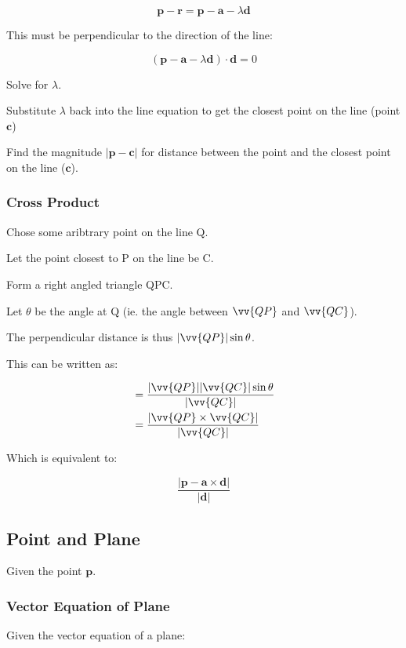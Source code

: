 \documentclass[a4paper,11pt]{article}
\newcommand{\bb}{\boldsymbol}
\begin{document}
$$
\bb{p} - \bb{r} = \bb{p} - \bb{a} - \lambda \bb{d}
$$

This must be perpendicular to the direction of the line:

$$
(\bb{p} - \bb{a} - \lambda \bb{d}) \cdot \bb{d} = 0
$$

Solve for $\lambda$.

Substitute $\lambda$ back into the line equation to get the closest point on
the line (point $\bb{c}$)

Find the magnitude $\lvert \bb{p} - \bb{c} \rvert$ for distance between the
point and the closest point on the line ($\bb{c}$).


\subsubsection{Cross Product}

Chose some aribtrary point on the line Q.

Let the point closest to P on the line be C.

Form a right angled triangle QPC.

Let $\theta$ be the angle at Q (ie. the angle between $\vv{QP}$ and
$\vv{QC}$).

The perpendicular distance is thus $\lvert \vv{QP} \rvert \sin{\theta}$.

This can be written as:

$$
\begin{aligned}
& = \frac{\lvert \vv{QP} \rvert \lvert \vv{QC} \rvert \sin{\theta}}{\lvert \vv{QC} \rvert} \\
& = \frac{\lvert \vv{QP} \times \vv{QC} \rvert}{\lvert \vv{QC} \rvert} \\
\end{aligned}
$$

Which is equivalent to:

$$
\frac{\lvert \bb{p} - \bb{a} \times \bb{d} \rvert}{\lvert \bb{d} \rvert}
$$


\subsection{Point and Plane}

Given the point $\bb{p}$.


\subsubsection{Vector Equation of Plane}

Given the vector equation of a plane:
\end{document}
